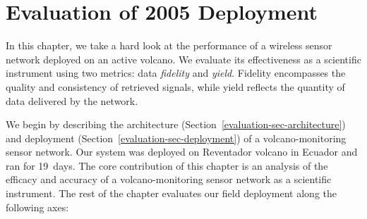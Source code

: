 \chapter{Evaluation of 2005 Deployment}
\label{chapter-evaluation}

In this chapter, we take a hard look at the performance of a wireless sensor
network deployed on an active volcano. We evaluate its effectiveness as a
scientific instrument using two metrics: data \textit{fidelity} and
\textit{yield}. Fidelity encompasses the quality and consistency of retrieved
signals, while yield reflects the quantity of data delivered by the network.

We begin by describing the architecture
(Section~\ref{evaluation-sec-architecture}) and deployment
(Section~\ref{evaluation-sec-deployment}) of a volcano-monitoring sensor
network. Our system was deployed on Reventador volcano in Ecuador and ran for
19~days. The core contribution of this chapter is an analysis of the efficacy
and accuracy of a volcano-monitoring sensor network as a scientific
instrument. The rest of the chapter evaluates our field deployment along the
following axes:

